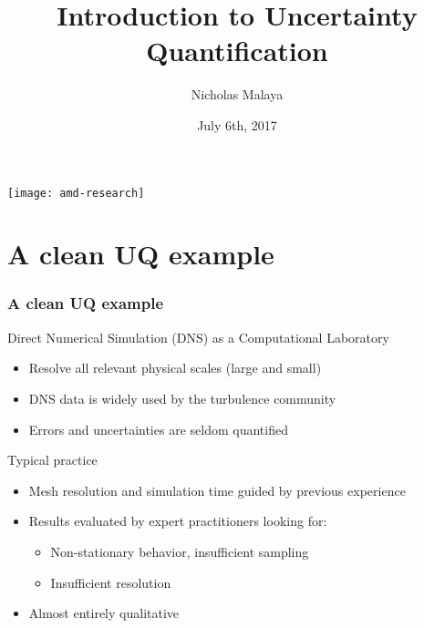 \documentclass[mathserif]{beamer}
\date{July 6th, 2017}
\author[Malaya]{Nicholas Malaya}
\institute{
AMD Research \\
Advanced Micro Devices
}
\title[UQ]{Introduction to Uncertainty Quantification}
\begin{document}
\begin{frame}
%
 \titlepage
 \begin{flushright}
  \texttt{[image: amd-research]}\\
 \end{flushright}
%
\end{frame}


\section{A clean UQ example}

\begin{frame}
\frametitle{A clean UQ example}

 \begin{block}{Direct Numerical Simulation (DNS) as a Computational Laboratory}
  \begin{itemize}
   \item Resolve all relevant physical scales (large and small)
   \item DNS data is widely used by the turbulence community
   \item Errors and uncertainties are seldom quantified 
 \end{itemize}

 \end{block}

 \begin{block}{Typical practice}
  \begin{itemize}
  \item Mesh resolution and simulation time guided by previous experience
  \item Results evaluated by expert practitioners looking for:
    \begin{itemize}
    \item Non-stationary behavior, insufficient sampling
    \item Insufficient resolution
    \end{itemize}
  \item Almost entirely qualitative
  \end{itemize}
\end{block}

\end{frame}
\end{document}
